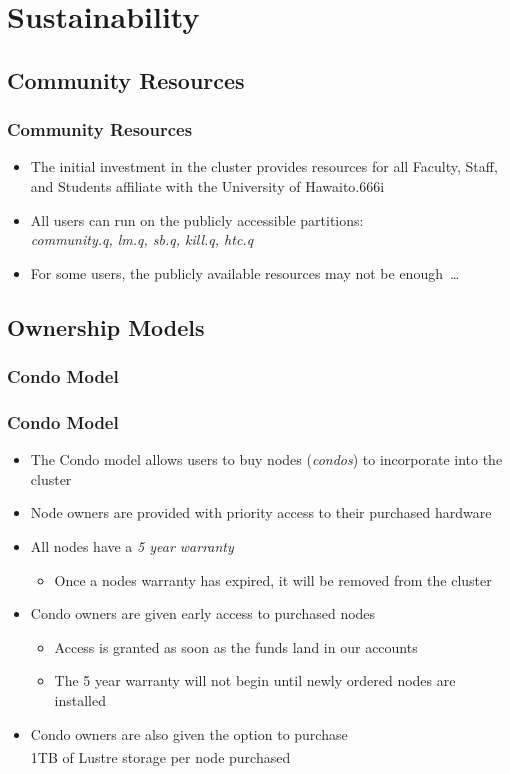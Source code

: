 \documentclass[t,hyperref={pdfpagelabels=false}]{beamer}
\newlength{\okinalen}
\newcommand{\okina}{\hbox to.666\okinalen{\hss`\hss}}
\newcommand{\regtrademark}{\fontsize{5}{6}\selectfont \textsuperscript{\textregistered}}
\newcommand{\hawaii}{Hawai{\okina}i}
\newcommand{\lustre}{Lustre{\regtrademark}}
\begin{document}
\section{Sustainability}
\subsection{Community Resources}
\begin{frame}
	\frametitle{Community Resources}
	\begin{itemize}
		\item The initial investment in the cluster provides resources for all Faculty, Staff, and Students affiliate with the University of {\hawaii}
		\item All users can run on the publicly accessible partitions:\\ \emph{community.q, lm.q, sb.q, kill.q, htc.q}
		\item For some users, the publicly available resources may not be enough~\ldots
	\end{itemize}
\end{frame}

\subsection{Ownership Models}

\subsubsection{Condo Model}
\begin{frame}
	\frametitle{Condo Model}
	\begin{itemize}
		\item The Condo model allows users to buy nodes (\emph{condos}) to incorporate into the cluster	
		\item Node owners are provided with priority access to their purchased hardware
		\item All nodes have a \emph{5 year warranty}
		\begin{itemize}
			\item Once a nodes warranty has expired, it will be removed from the cluster
		\end{itemize}
		\item Condo owners are given early access to purchased nodes
		  \begin{itemize}
                    \item Access is granted as soon as the funds land in our accounts
		    \item The 5 year warranty will not begin until newly ordered nodes are installed
		\end{itemize}
		\item Condo owners are also given the option to purchase~\\1TB of {\lustre} storage per node purchased
	\end{itemize}
\end{frame}
\end{document}
